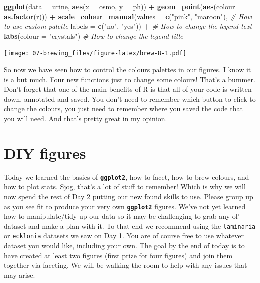 \documentclass[
]{book}
\newenvironment{Shaded}{\begin{snugshade}}{\end{snugshade}}
\newcommand{\CommentTok}[1]{\textcolor[rgb]{0.56,0.35,0.01}{\textit{#1}}}
\newcommand{\DataTypeTok}[1]{\textcolor[rgb]{0.13,0.29,0.53}{#1}}
\newcommand{\KeywordTok}[1]{\textcolor[rgb]{0.13,0.29,0.53}{\textbf{#1}}}
\newcommand{\NormalTok}[1]{#1}
\newcommand{\OperatorTok}[1]{\textcolor[rgb]{0.81,0.36,0.00}{\textbf{#1}}}
\newcommand{\StringTok}[1]{\textcolor[rgb]{0.31,0.60,0.02}{#1}}
\begin{document}
\begin{Shaded}
\begin{Highlighting}[]
\KeywordTok{ggplot}\NormalTok{(}\DataTypeTok{data =}\NormalTok{ urine, }\KeywordTok{aes}\NormalTok{(}\DataTypeTok{x =}\NormalTok{ osmo, }\DataTypeTok{y =}\NormalTok{ ph)) }\OperatorTok{+}
\StringTok{  }\KeywordTok{geom\_point}\NormalTok{(}\KeywordTok{aes}\NormalTok{(}\DataTypeTok{colour =} \KeywordTok{as.factor}\NormalTok{(r))) }\OperatorTok{+}
\StringTok{  }\KeywordTok{scale\_colour\_manual}\NormalTok{(}\DataTypeTok{values =} \KeywordTok{c}\NormalTok{(}\StringTok{"pink"}\NormalTok{, }\StringTok{"maroon"}\NormalTok{), }\CommentTok{\# How to use custom palette}
                     \DataTypeTok{labels =} \KeywordTok{c}\NormalTok{(}\StringTok{"no"}\NormalTok{, }\StringTok{"yes"}\NormalTok{)) }\OperatorTok{+}\StringTok{ }\CommentTok{\# How to change the legend text}
\StringTok{  }\KeywordTok{labs}\NormalTok{(}\DataTypeTok{colour =} \StringTok{"crystals"}\NormalTok{) }\CommentTok{\# How to change the legend title}
\end{Highlighting}
\end{Shaded}

\texttt{[image: 07-brewing\_files/figure-latex/brew-8-1.pdf]}

So now we have seen how to control the colours palettes in our figures. I know it is a but much. Four new functions just to change some colours! That's a bummer. Don't forget that one of the main benefits of R is that all of your code is written down, annotated and saved. You don't need to remember which button to click to change the colours, you just need to remember where you saved the code that you will need. And that's pretty great in my opinion.

\hypertarget{diy-figures}{%
\section{DIY figures}\label{diy-figures}}

Today we learned the basics of \textbf{\texttt{ggplot2}}, how to facet, how to brew colours, and how to plot stats. Sjog, that's a lot of stuff to remember! Which is why we will now spend the rest of Day 2 putting our new found skills to use. Please group up as you see fit to produce your very own \textbf{\texttt{ggplot2}} figures. We've not yet learned how to manipulate/tidy up our data so it may be challenging to grab any ol' dataset and make a plan with it. To that end we recommend using the \texttt{laminaria} or \texttt{ecklonia} datasets we saw on Day 1. You are of course free to use whatever dataset you would like, including your own. The goal by the end of today is to have created at least two figures (first prize for four figures) and join them together via faceting. We will be walking the room to help with any issues that may arise.
\end{document}
